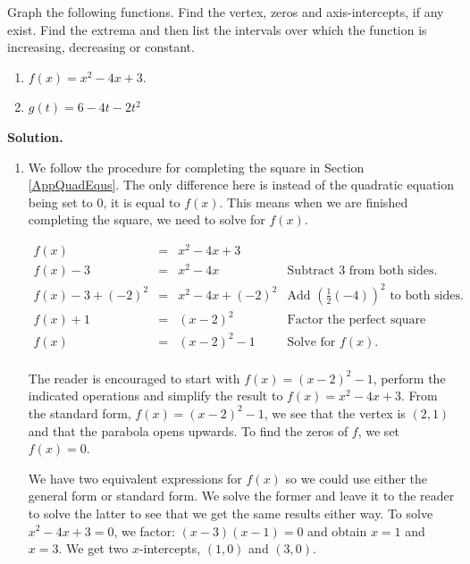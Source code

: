 \begin{ex}  \label{parabolaex2} Graph the following functions.  Find the vertex, zeros and axis-intercepts, if any exist. Find the extrema and then list the intervals over which the function is increasing, decreasing or constant.

\begin{multicols}{2}
\begin{enumerate}

\item  $f(x) = x^2-4x+3$.
\item  $g(t) = 6 - 4t -2t^2$

\end{enumerate}
\end{multicols}


{\bf Solution.} 

\begin{enumerate}

\item   We follow the procedure for completing the square in Section \ref{AppQuadEqus}.  The only difference here is instead of the quadratic equation being set to $0$, it is equal to $f(x)$.  This means when we are finished completing the square, we need to solve for $f(x)$.

\[ \begin{array}{rclr}

f(x) & = & x^2 - 4x+3 & \\ [4pt]
f(x) - 3 & = & x^2-4x & \text{Subtract $3$ from both sides.} \\ [4pt]
f(x) - 3 + (-2)^2 & = & x^2-4x+(-2)^2 & \text{Add $\left(\frac{1}{2}(-4)\right)^2$ to both sides.} \\ [4pt]

f(x) + 1 & = &  (x-2)^2 & \text{Factor the perfect square trinomial.} \\ [4pt]

f(x) & = & (x-2)^2 - 1 & \text{Solve for $f(x)$.} \\ \end{array}\]

The reader is encouraged to start with $f(x) = (x-2)^2-1$, perform the indicated operations and simplify the result to $f(x) = x^2-4x+3$.  From the standard form, $f(x) = (x-2)^2-1$, we see that the vertex is $(2,1)$ and that the parabola opens upwards.  To find the zeros of $f$, we set $f(x) = 0$.

\medskip

We have two equivalent expressions for $f(x)$ so we could use either the general form or standard form.  We solve the former and leave it to the reader to solve the latter to see that we get the same results either way.  To solve $x^2 - 4x + 3 = 0$, we factor: $(x-3)(x-1) = 0$ and obtain $x = 1$ and $x =3$.  We get two $x$-intercepts, $(1,0)$ and $(3,0)$. 


\end{enumerate}
\end{ex}
